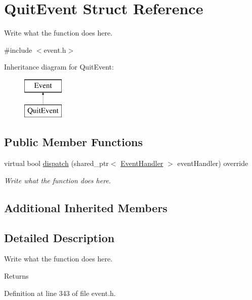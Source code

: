 \hypertarget{structQuitEvent}{\section{Quit\+Event Struct Reference}
\label{structQuitEvent}
}


Write what the function does here.  




{\ttfamily \#include $<$event.\+h$>$}

Inheritance diagram for Quit\+Event\+:\begin{figure}[H]
\begin{center}
\leavevmode
\includegraphics[height=2.000000cm]{structQuitEvent}
\end{center}
\end{figure}
\subsection*{Public Member Functions}
\begin{DoxyCompactItemize}
\item 
virtual bool \hyperlink{structQuitEvent_ac008fb404abe76e5a79741b61e59c37c}{dispatch} (shared\+\_\+ptr$<$ \hyperlink{structEventHandler}{Event\+Handler} $>$ event\+Handler) override
\begin{DoxyCompactList}\small\item\em Write what the function does here. \end{DoxyCompactList}\end{DoxyCompactItemize}
\subsection*{Additional Inherited Members}


\subsection{Detailed Description}
Write what the function does here. 

\begin{DoxyReturn}{Returns}

\end{DoxyReturn}


Definition at line 343 of file event.\+h.



